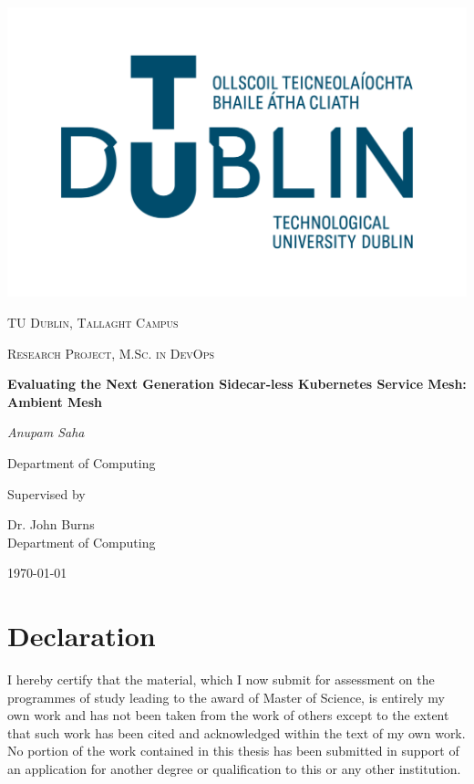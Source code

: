 \documentclass[12pt]{article}
\begin{document}
\thispagestyle{empty}
\setlength\headheight{0pt} 
\begin{center}

\begin{center}
\includegraphics[width=0.65\linewidth]{resources/TUD_Logo.png}
\end{center}	

  \vspace{0.25cm}
  {\scshape\LARGE TU Dublin, Tallaght Campus \par}
  \vspace{0.25cm}
  {\scshape\Large Research Project, M.Sc. in DevOps\par}
  \vspace{0.5cm}

  {\Large\bfseries Evaluating the Next Generation Sidecar-less Kubernetes Service Mesh: Ambient Mesh\par}
  
  \vspace{0.5cm}
  {\Large\itshape Anupam Saha\par}
  Department of Computing
  \vspace{0.25cm}

\vspace{1cm}
Supervised by\par
Dr. John Burns \\
Department of Computing\par
\vspace{1.5cm}
\large
\today

\end{center}

\clearpage
\restoregeometry
\justify

\section*{Declaration}
I hereby certify that the material, which I now submit for assessment on the programmes of study leading to the award of Master of Science, is entirely my own work and has not been taken from the work of others except to the extent that such work has been cited and acknowledged within the text of my own work. No portion of the work contained in this thesis has been submitted in support of an application for another degree or qualification to this or any other institution.
\end{document}
